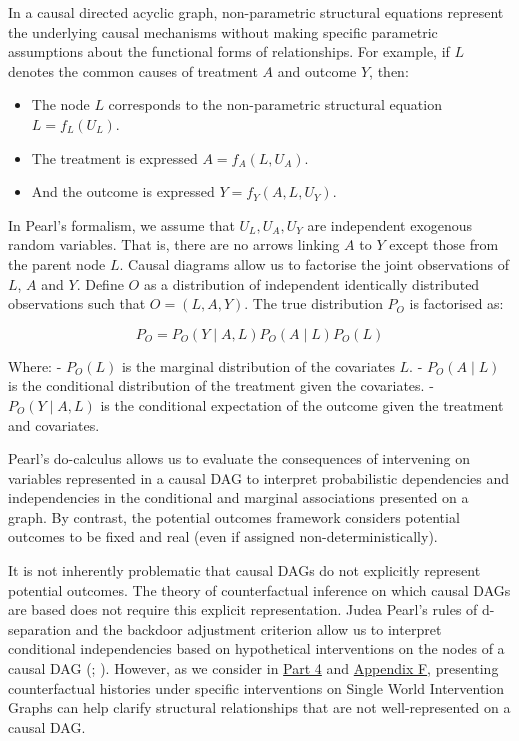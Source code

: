 \documentclass[
  single column]{article}
\providecommand{\tightlist}{%
  \setlength{\itemsep}{0pt}\setlength{\parskip}{0pt}}\usepackage{longtable,booktabs,array}
\begin{document}
In a causal directed acyclic graph, non-parametric structural equations
represent the underlying causal mechanisms without making specific
parametric assumptions about the functional forms of relationships. For
example, if \(L\) denotes the common causes of treatment \(A\) and
outcome \(Y\), then:

\begin{itemize}
\tightlist
\item
  The node \(L\) corresponds to the non-parametric structural equation
  \(L = f_L(U_L)\).
\item
  The treatment is expressed \(A = f_A(L, U_A)\).
\item
  And the outcome is expressed \(Y = f_Y(A, L, U_Y)\).
\end{itemize}

In Pearl's formalism, we assume that \(U_L, U_A, U_Y\) are independent
exogenous random variables. That is, there are no arrows linking \(A\)
to \(Y\) except those from the parent node \(L\). Causal diagrams allow
us to factorise the joint observations of \(L\), \(A\) and \(Y\). Define
\(O\) as a distribution of independent identically distributed
observations such that \(O = (L, A, Y)\). The true distribution \(P_O\)
is factorised as:

\[
P_O = P_O(Y \mid A, L) P_O(A \mid L) P_O(L)
\]

Where: - \(P_O(L)\) is the marginal distribution of the covariates
\(L\). - \(P_O(A \mid L)\) is the conditional distribution of the
treatment given the covariates. - \(P_O(Y \mid A, L)\) is the
conditional expectation of the outcome given the treatment and
covariates.

Pearl's do-calculus allows us to evaluate the consequences of
intervening on variables represented in a causal DAG to interpret
probabilistic dependencies and independencies in the conditional and
marginal associations presented on a graph. By contrast, the potential
outcomes framework considers potential outcomes to be fixed and real
(even if assigned non-deterministically).

It is not inherently problematic that causal DAGs do not explicitly
represent potential outcomes. The theory of counterfactual inference on
which causal DAGs are based does not require this explicit
representation. Judea Pearl's rules of d-separation and the backdoor
adjustment criterion allow us to interpret conditional independencies
based on hypothetical interventions on the nodes of a causal DAG
(;
). However, as we consider in
\hyperref[id-sec-4]{Part 4} and \hyperref[id-app-f]{Appendix F},
presenting counterfactual histories under specific interventions on
Single World Intervention Graphs can help clarify structural
relationships that are not well-represented on a causal DAG.
\end{document}
